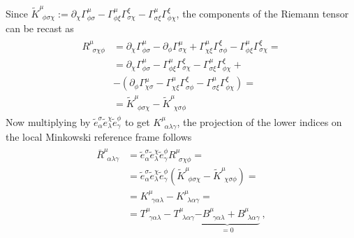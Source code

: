 \documentclass[letterpaper,10pt,english]{jupyterBook}
\begin{document}
\sphinxAtStartPar
Since \(\widetilde{K}^{\mu}_{\ \ \phi \sigma \chi} := \partial_{\chi} \Gamma^{\mu}_{\phi \sigma} - \Gamma^{\mu}_{\phi \xi} \Gamma^{\xi}_{\sigma \chi} - \Gamma^{\mu}_{\sigma \xi} \Gamma^{\xi}_{\phi \chi}\), the components of the Riemann tensor can be recast as
\begin{equation*}
\begin{split}\begin{aligned}
  R^{\mu}_{\ \ \sigma \chi \phi} 
  & = \partial_{\chi} \Gamma^{\mu}_{\phi \sigma} - \partial_{\phi} \Gamma^{\mu}_{\sigma \chi} + \Gamma^{\mu}_{\chi \xi} \Gamma^{\xi}_{\sigma \phi} - \Gamma^{\mu}_{\phi \xi} \Gamma^{\xi}_{\sigma \chi} = \\
  & =        \partial_{\chi} \Gamma^{\mu}_{\phi \sigma} - \Gamma^{\mu}_{\phi \xi} \Gamma^{\xi}_{\sigma \chi} - \Gamma^{\mu}_{\sigma \xi} \Gamma^{\xi}_{\phi \chi} + \\
  & - \left( \partial_{\phi} \Gamma^{\mu}_{\chi \sigma} - \Gamma^{\mu}_{\chi \xi} \Gamma^{\xi}_{\sigma \phi} - \Gamma^{\mu}_{\sigma \xi} \Gamma^{\xi}_{\phi \chi}\right) = \\
  & = \widetilde{K}^{\mu}_{\ \ \phi \sigma \chi} - \widetilde{K}^{\mu}_{\ \ \chi \sigma \phi}
\end{aligned}\end{split}
\end{equation*}
\sphinxAtStartPar
Now multiplying by \( \widetilde{e}^{\sigma}_{\alpha} \widetilde{e}^{\chi}_{\lambda} \widetilde{e}^{\phi}_{\gamma}\) to get \(K^{\mu}_{\ \ \alpha \lambda \gamma}\), the projection of the lower indices on the local Minkowski reference frame follows
\begin{equation*}
\begin{split}\begin{aligned}
   \bar{R}^{\mu}_{\ \ \alpha \lambda \gamma}
   & =\widetilde{e}^{\sigma}_{\alpha} \widetilde{e}^{\chi}_{\lambda} \widetilde{e}^{\phi}_{\gamma}  R^{\mu}_{\ \ \sigma \chi \phi} = \\
   & =\widetilde{e}^{\sigma}_{\alpha} \widetilde{e}^{\chi}_{\lambda} \widetilde{e}^{\phi}_{\gamma} \left( \widetilde{K}^{\mu}_{\ \ \phi \sigma \chi } - \widetilde{K}^{\mu}_{\ \ \chi \sigma \phi} \right) = \\
   & = K^{\mu}_{\ \ \gamma \alpha \lambda} - K^{\mu}_{\ \ \lambda \alpha \gamma} = \\
   & = T^{\mu}_{\ \ \gamma \alpha \lambda} - T^{\mu}_{\ \ \lambda \alpha \gamma} \underbrace{ - B^{\mu}_{\ \ \gamma \alpha \lambda} + B^{\mu}_{\ \ \lambda \alpha \gamma} }_{=0} \ ,
\end{aligned}\end{split}
\end{equation*}
\end{document}
